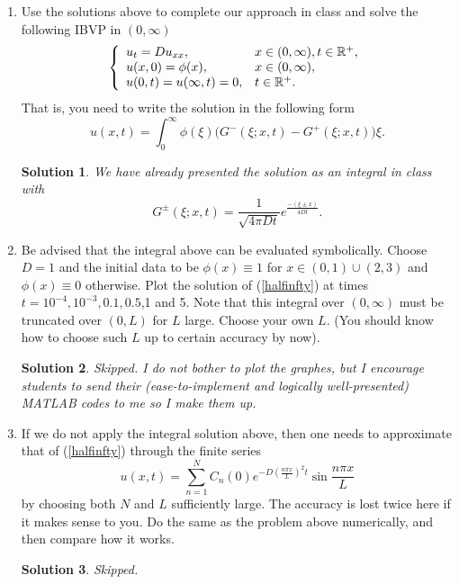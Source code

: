 \documentclass[6pt]{article}
\newtheorem{solution}{Solution}
\numberwithin{equation}{section}
\def\mathbb{\Bbb}
\begin{document}
\begin{enumerate}
\item Use the solutions above to complete our approach in class and solve the following IBVP in $(0,\infty)$
\begin{equation}\label{halfinfty}
\left\{
\begin{array}{ll}
u_t=D u_{xx},& x\in (0,\infty), t\in\mathbb R^+,\\
u(x,0)=\phi(x),&x \in (0,\infty),\\
u(0,t)=u(\infty,t)=0,&t\in\mathbb R^+.
\end{array}
\right.
\end{equation}
That is, you need to write the solution in the following form
\[u(x,t)=\int_0^\infty \phi(\xi)\big(G^-(\xi;x,t)-G^+(\xi;x,t)\big)\xi.\]
\begin{solution}
We have already presented the solution as an integral in class with
\[G^\pm(\xi;x,t)=\frac{1}{\sqrt{4\pi Dt}}e^\frac{-(\xi\pm x)}{4Dt}.\]
\end{solution}



\item Be advised that the integral above can be evaluated symbolically.  Choose $D=1$ and the initial data to be $\phi(x)\equiv 1$ for $x\in(0,1)\cup(2,3)$ and $\phi(x)\equiv0$ otherwise.  Plot the solution of (\ref{halfinfty}) at times $t=10^{-4},10^{-3},0.1,0.5$,1 and 5.  Note that this integral over $(0,\infty)$ must be truncated over $(0,L)$ for $L$ large.  Choose your own $L$.  (You should know how to choose such $L$ up to certain accuracy by now).
\begin{solution}
Skipped.  I do not bother to plot the graphes, but I encourage students to send their (ease-to-implement and logically well-presented) MATLAB codes to me so I make them up.
\end{solution}

\item If we do not apply the integral solution above, then one needs to approximate that of (\ref{halfinfty}) through the finite series
\[u(x,t)=\sum_{n=1}^NC_n(0)e^{-D(\frac{n\pi x}{L})^2t}\sin\frac{n\pi x}{L}\]
by choosing both $N$ and $L$ sufficiently large.  The accuracy is lost twice here if it makes sense to you.  Do the same as the problem above numerically, and then compare how it works.
\begin{solution}
Skipped.
\end{solution}


\end{enumerate}
\end{document}
